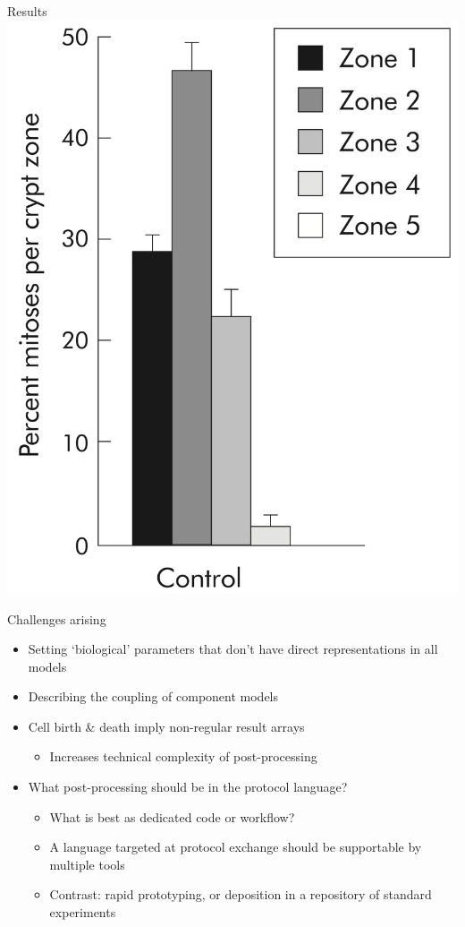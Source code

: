 \documentclass[t,xcolor={usenames,dvipsnames}]{beamer}
\newcommand{\subitem}[1]{\begin{itemize}[<.->]\item #1 \end{itemize}}
\begin{document}
\begin{frame}{Results}
\includegraphics[height=.4\textheight]{WongFigure}
\end{frame}


\begin{frame}{Challenges arising}
\begin{itemize}[<+->]
\item Setting `biological' parameters that don't have direct representations in all models
\item Describing the coupling of component models
\item Cell birth \& death imply non-regular result arrays
  \subitem{Increases technical complexity of post-processing}
\item What post-processing should be in the protocol language?
  \begin{itemize}[<.->]
  \item What is best as dedicated code or workflow?
  \item A language targeted at protocol exchange should be supportable by multiple tools
  \item Contrast: rapid prototyping, or deposition in a repository of standard experiments
  \end{itemize}
\end{itemize}
\end{frame}
\end{document}
